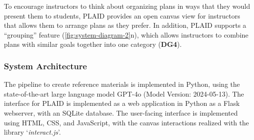 To encourage instructors to think about organizing plans in ways that they would present them to students, PLAID provides an open canvas view for instructors that allows them to arrange plans as they prefer. In addition, PLAID supports a ``grouping'' feature (\cref{fig:system-diagram-2}n), which allows instructors to combine plans with similar goals together into one category (\textbf{DG4}).


\subsubsection{System Architecture}
The pipeline to create reference materials is implemented in Python, using the state-of-the-art large language model GPT-4o (Model Version: 2024-05-13). The interface for PLAID is implemented as a web application in Python as a Flask webserver, with an SQLite database. The user-facing interface is implemented using HTML, CSS, and JavaScript, with the canvas interactions realized with the library `\textit{interact.js}'. 


